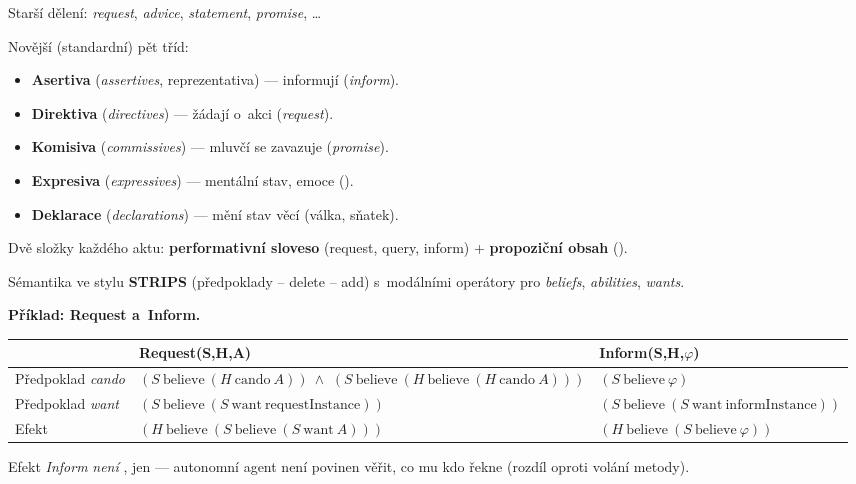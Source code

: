 \documentclass[11pt,a4paper]{article}
\theoremstyle{definition}
\begin{document}
\begin{defbox}
Starší dělení: \emph{request}, \emph{advice}, \emph{statement}, \emph{promise}, \dots

Novější (standardní) pět tříd:
\begin{itemize}
\item \textbf{Asertiva} (\emph{assertives}, reprezentativa) --- informují (\emph{inform}).
\item \textbf{Direktiva} (\emph{directives}) --- žádají o~akci (\emph{request}).
\item \textbf{Komisiva} (\emph{commissives}) --- mluvčí se zavazuje (\emph{promise}).
\item \textbf{Expresiva} (\emph{expressives}) --- mentální stav, emoce ().
\item \textbf{Deklarace} (\emph{declarations}) --- mění stav věcí (válka, sňatek).
\end{itemize}
Dvě složky každého aktu: \textbf{performativní sloveso} (request, query, inform)
+ \textbf{propoziční obsah} ().
\end{defbox}

\begin{defbox}

Sémantika ve stylu \textbf{STRIPS} (předpoklady -- delete -- add) s~modálními operátory pro
\emph{beliefs}, \emph{abilities}, \emph{wants}.
\end{defbox}

\noindent\textbf{Příklad: Request a~Inform.}
\begin{center}\small
\begin{tabular}{p{} p{} p{}}
\toprule
& \textbf{Request(S,H,A)} & \textbf{Inform(S,H,$\varphi$)} \\
\midrule
Předpoklad \emph{cando}
  & $(S\ \mathrm{believe}\ (H\ \mathrm{cando}\ A))\ \wedge$ \newline
    $(S\ \mathrm{believe}\ (H\ \mathrm{believe}\ (H\ \mathrm{cando}\ A)))$
  & $(S\ \mathrm{believe}\ \varphi)$ \\
Předpoklad \emph{want}
  & $(S\ \mathrm{believe}\ (S\ \mathrm{want}\ \mathrm{requestInstance}))$
  & $(S\ \mathrm{believe}\ (S\ \mathrm{want}\ \mathrm{informInstance}))$ \\
Efekt
  & $(H\ \mathrm{believe}\ (S\ \mathrm{believe}\ (S\ \mathrm{want}\ A)))$
  & $(H\ \mathrm{believe}\ (S\ \mathrm{believe}\ \varphi))$ \\
\bottomrule
\end{tabular}
\end{center}
Efekt \emph{Inform} \emph{není} , jen  --- autonomní agent není povinen věřit, co mu kdo řekne (rozdíl oproti volání metody).
\end{document}
